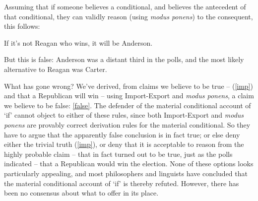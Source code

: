 Assuming that if someone believes a conditional, and believes the antecedent of that conditional, they can validly reason (using \emph{modus ponens}) to the consequent, this follows: \begin{exe}
	\ex If it's not Reagan who wins, it will be Anderson.\label{false}
\end{exe}
But this is false: Anderson was a distant third in the polls, and the most likely alternative to Reagan was Carter. 


What has gone wrong? We've derived, from claims we believe to be true – (\ref{imp}) and that a Republican will win – using Import-Export and \emph{modus ponens}, a claim we believe to be false: \eqref{false}. The defender of the material conditional account of `if' cannot object to either of these rules, since both Import-Export and \emph{modus ponens} are provably correct derivation rules for the material conditional. So they have to argue that the apparently false conclusion is in fact true; or else deny either the trivial truth (\ref{imp}), or deny that it is acceptable to reason from the highly probable claim – that in fact turned out to be true, just as the polls indicated – that a Republican would win the election. None of these options looks particularly appealing, and most philosophers and linguists have concluded that the material conditional account of `if' is thereby refuted. However, there has been no consensus about what to offer in its place. 




